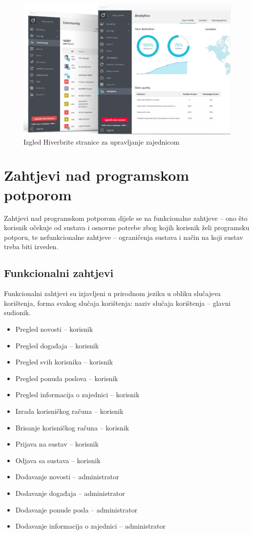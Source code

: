 \documentclass[times, utf8, zavrsni]{fer}
\begin{document}
\begin{figure}[!htb]
\centering
\includegraphics[width=13cm]{slike/hiverbrite-upravljanje.png}
\caption{Izgled Hiverbrite stranice za upravljanje zajednicom}
\label{fig:hiverbrite-menagements}
\end{figure}

\chapter{Zahtjevi nad programskom potporom}
Zahtjevi nad programskom potporom dijele se na funkcionalne zahtjeve – ono što korisnik očekuje od sustava i osnovne potrebe zbog kojih korisnik želi programsku potporu, te nefunkcionalne zahtjeve – ograničenja sustava i način na koji sustav treba biti izveden.

\section{Funkcionalni zahtjevi}
Funkcionalni zahtjevi su izjavljeni u prirodnom jeziku u obliku slučajeva korištenja, forma svakog slučaja korištenja: naziv slučaja korištenja – glavni sudionik.

 
\begin{itemize}
  \item Pregled novosti – korisnik
  \item Pregled događaja – korisnik
  \item Pregled svih korisnika – korisnik
  \item Pregled ponuda poslova – korisnik
  \item Pregled informacija o zajednici – korisnik
  \item Izrada korisničkog računa – korisnik
  \item Brisanje korisničkog računa – korisnik 
  \item Prijava na sustav – korisnik 
  \item Odjava sa sustava – korisnik
  \item Dodavanje novosti – administrator
  \item Dodavanje događaja – administrator 
  \item Dodavanje ponude posla – administrator
  \item Dodavanje informacija o zajednici – administrator 
\end{itemize}
\end{document}

